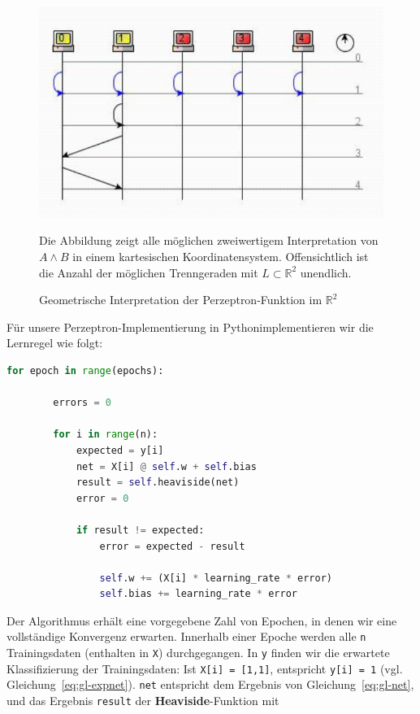 \begin{figure}[h]
    \centering
    \includegraphics{images/p1ReadSeq.pdf}
    \caption{Geometrische Interpretation der Perzeptron-Funktion im $\mathbb{R}^2$}
    \label{fig-rpand}
    \small Die Abbildung zeigt alle möglichen zweiwertigem Interpretation von $A \land B$ in einem kartesischen Koordinatensystem. Offensichtlich ist die Anzahl der möglichen Trenngeraden mit $L \subset  \mathbb{R}^2$ unendlich.
\end{figure}

\pagebreak
Für unsere Perzeptron-Implementierung in Python\footnotemark[33] implementieren wir die Lernregel wie folgt:


\begin{lstlisting}[language=Python]
    for epoch in range(epochs):

        errors = 0

        for i in range(n):
            expected = y[i]
            net = X[i] @ self.w + self.bias
            result = self.heaviside(net)
            error = 0

            if result != expected:
                error = expected - result

                self.w += (X[i] * learning_rate * error)
                self.bias += learning_rate * error
\end{lstlisting}

\noindent
Der Algorithmus erhält eine vorgegebene Zahl von Epochen, in denen wir eine vollständige Konvergenz erwarten.
Innerhalb einer Epoche werden alle \verb|n| Trainingsdaten (enthalten in \verb|X|) durchgegangen.
In \verb|y| finden wir die erwartete Klassifizierung der Trainingsdaten:
Ist \verb|X[i] = [1,1]|, entspricht \verb|y[i] = 1| (vgl. Gleichung~\ref{eq:gl-expnet}).
\verb|net| entspricht dem Ergebnis von Gleichung~\ref{eq:gl-net}, und das Ergebnis \verb|result| der \textbf{Heaviside}-Funktion mit

